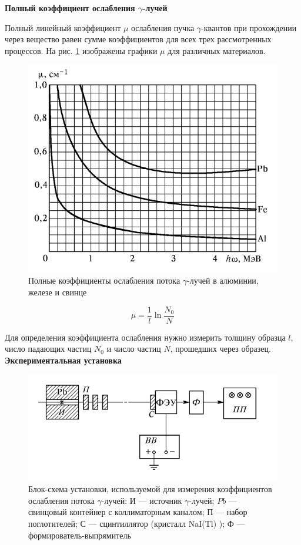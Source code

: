 \documentclass[a4paper, 12pt]{article}%
\begin{document}
	\textbf{Полный коэффициент ослабления $\gamma$-лучей}
	
	Полный линейный коэффициент $ \mu $ ослабления пучка $\gamma$-квантов при прохождении через вещество равен сумме коэффициентов для всех трех рассмотренных процессов. На рис. \ref{ris mu} изображены графики $ \mu $ для различных материалов.
	
	\begin{figure}[h!]
		\centering
		\includegraphics[width=0.6\linewidth]{1}
		\caption{Полные коэффициенты ослабления потока $\gamma$-лучей в алюминии, железе и свинце}
		\label{ris mu}
	\end{figure}
	
	\begin{equation}\label{mu}
		\mu = \dfrac{1}{l} \ln{\dfrac{N_0}{N}}
	\end{equation}
	
	Для определения коэффициента ослабления нужно измерить толщину образца $ l $, число падающих частиц $ N_0 $ и число
	частиц $ N $, прошедших через образец.\\
	
	\textbf{Экспериментальная установка}\\
	
	\begin{figure}[h!]
		\centering
		\includegraphics[width=0.7\linewidth]{2}
		\caption{Блок-схема установки, используемой для измерения коэффициентов ослабления потока $\gamma$-лучей: И --- источник $\gamma$-лучей; $ Pb $ --- свинцовый контейнер с коллиматорным каналом; П --- набор поглотителей; С --- сцинтиллятор (кристалл
			NaI(Tl) ); Ф --- формирователь-выпрямитель}
	\end{figure}
	
\end{document}
